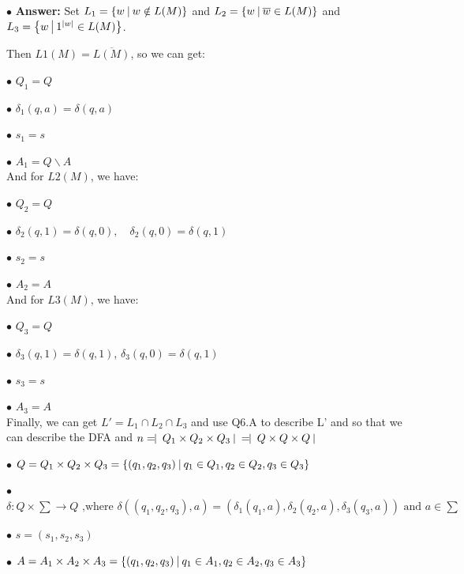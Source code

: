 \documentclass[12pt,a4paper]{article}
\begin{document}
	$\bullet$ \textbf{Answer:}
Set $L_1=\left\{ w \ \vline\ w \notin L(M) \right\}$ and $L_2=\left\{w \ \vline\ \overline{w} \in L(M)\right\}$ and $L_3=\left\{w \ \vline\ 1^{|w|} \in L(M)\right\}$.


	Then $L1(M)=\overline{L(M)}$, so we can get:
	
	$\bullet$ $Q_1 = Q$

	$\bullet$ $\delta_1(q,a) = \delta(q,a) $

	$\bullet$ $s_1 = s$

	$\bullet$ $A_1 = Q \backslash A$\\

	And for $L2(M)$, we have:
	
	$\bullet$ $Q_2 = Q$

	$\bullet$ $\delta_2(q,1) = \delta(q,0), \quad \delta_2(q,0) = \delta(q,1) $

	$\bullet$ $s_2 = s$

	$\bullet$ $A_2 = A$\\

	And for $L3(M)$, we have:
	
	$\bullet$ $Q_3 = Q$

	$\bullet$ $\delta_3(q,1) = \delta(q,1)$, $\delta_3(q,0) = \delta(q,1)$

	$\bullet$ $s_3 = s$

	$\bullet$ $A_3 = A$\\
	
	Finally, we can get $L' = L_1 \cap L_2 \cap L_3$ and use Q6.A to describe L' and so that we can describe the DFA and $n= \vline\ Q_1 \times Q_2 \times Q_3 \   \vline\ = \vline\ Q \times Q \times Q \ \vline\ $
	
	$\bullet$ $Q = Q_1 \times Q_2 \times Q_3 = \{(q_1,q_2,q_3)\ \vline\ q_1 \in Q_1, q_2 \in Q_2, q_3 \in Q_3\}$

	$\bullet$ $\delta:Q \times \sum \rightarrow Q \mbox{ ,where } \delta((q_1,q_2,q_3),a) = (\delta_1(q_1,a),\delta_2(q_2,a),\delta_3(q_3,a)) \mbox{ and } a \in \sum$

	$\bullet$ $s = (s_1,s_2,s_3)$

	$\bullet$ $A = A_1 \times A_2 \times A_3 = \{(q_1,q_2,q_3)\ \vline\ q_1 \in A_1, q_2 \in A_2, q_3 \in A_3\}$
\end{document}
